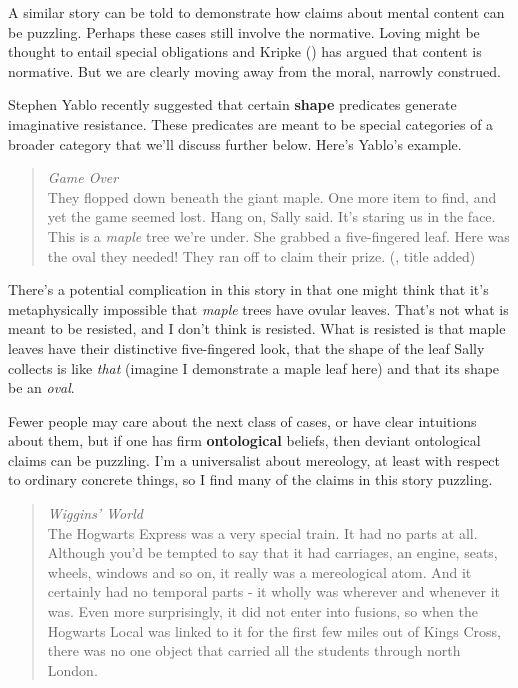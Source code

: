 \documentclass[
  10pt,
  letterpaper,
  DIV=11,
  numbers=noendperiod,
  twoside]{scrartcl}
\begin{document}
A similar story can be told to demonstrate how claims about mental
content can be puzzling. Perhaps these cases still involve the
normative. Loving might be thought to entail special obligations and
Kripke () has argued that content is
normative. But we are clearly moving away from the moral, narrowly
construed.

Stephen Yablo recently suggested that certain \textbf{shape} predicates
generate imaginative resistance. These predicates are meant to be
special categories of a broader category that we'll discuss further
below. Here's Yablo's example.

\begin{quote}
\emph{Game Over}\\
They flopped down beneath the giant maple. One more item to find, and
yet the game seemed lost. Hang on, Sally said. It's staring us in the
face. This is a \emph{maple} tree we're under. She grabbed a
five-fingered leaf. Here was the oval they needed! They ran off to claim
their prize. (, title added)
\end{quote}

There's a potential complication in this story in that one might think
that it's metaphysically impossible that \emph{maple} trees have ovular
leaves. That's not what is meant to be resisted, and I don't think is
resisted. What is resisted is that maple leaves have their distinctive
five-fingered look, that the shape of the leaf Sally collects is like
\emph{that} (imagine I demonstrate a maple leaf here) and that its shape
be an \emph{oval}.

Fewer people may care about the next class of cases, or have clear
intuitions about them, but if one has firm \textbf{ontological} beliefs,
then deviant ontological claims can be puzzling. I'm a universalist
about mereology, at least with respect to ordinary concrete things, so I
find many of the claims in this story puzzling.

\begin{quote}
\emph{Wiggins' World}\\
The Hogwarts Express was a very special train. It had no parts at all.
Although you'd be tempted to say that it had carriages, an engine,
seats, wheels, windows and so on, it really was a mereological atom. And
it certainly had no temporal parts - it wholly was wherever and whenever
it was. Even more surprisingly, it did not enter into fusions, so when
the Hogwarts Local was linked to it for the first few miles out of Kings
Cross, there was no one object that carried all the students through
north London.
\end{quote}
\end{document}
